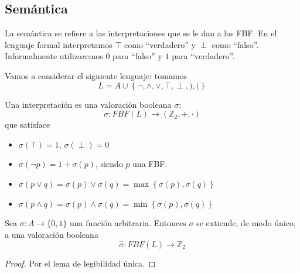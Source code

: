 \subsection{Semántica}
La semántica se refiere a las interpretaciones que se le dan a las FBF. En el lenguaje formal interpretamos $\top$ como ``verdadero'' y $\perp$ como ``falso''. Informalmente utilizaremos $0$ para ``falso'' y $1$ para ``verdadero''.

Vamos a considerar el siguiente lenguaje: tomamos $$L= A\cup \left\{\neg, \wedge, \vee, \top, \perp, ), ( \right\}$$

\begin{defn}[Interpretación]
Una interpretación es una valoración booleana $\sigma$: $$\sigma: FBF(L)\to (\mathbb{Z}_2, +, \cdot) $$
que satisface
\begin{itemize}
	\item $\sigma(\top) = 1$, $\sigma(\perp) = 0$
	\item $\sigma(\neg p) = 1+\sigma(p)$,  siendo $p$ una FBF.
	\item $\sigma (p\vee q) = \sigma(p) \vee \sigma (q) = \max\left\{\sigma(p), \sigma(q)\right\}$
	\item $\sigma (p\wedge q) = \sigma(p) \wedge \sigma (q) = \min\left\{\sigma(p), \sigma(q)\right\}$
\end{itemize}
\end{defn}

\begin{theorem}
	Sea $\sigma: A \to \{0, 1\}$ una función arbitraria. Entonces $\sigma$ se extiende, de modo único, a una valoración booleana $$\hat{\sigma}:FBF(L) \to \mathbb{Z}_2$$
\end{theorem}
\begin{proof}
	Por el lema de legibilidad única.
\end{proof}

